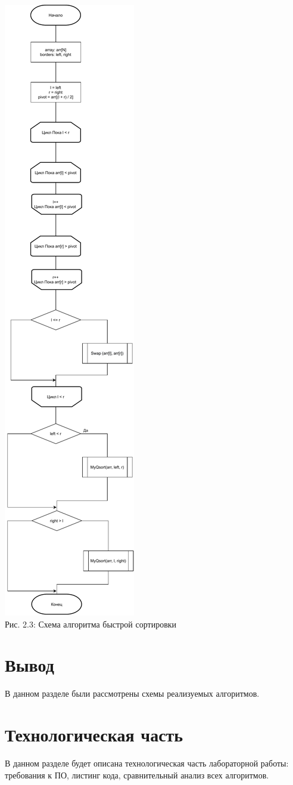 \documentclass[12pt,a4paper]{article}
\numberwithin{equation}{section}
\begin{document}
\begin{center}
	\includegraphics[width=.3\linewidth]{src/schemas/QSort}\\
	Рис. 2.3: Схема алгоритма быстрой сортировки
\end{center}
\clearpage
{}
\section*{Вывод}
\qquad В данном разделе были рассмотрены схемы реализуемых алгоритмов.
\clearpage

\section{Технологическая часть}
\qquad В данном разделе будет описана технологическая часть лабораторной работы: требования к ПО, листинг кода, сравнительный анализ всех алгоритмов.
\end{document}
